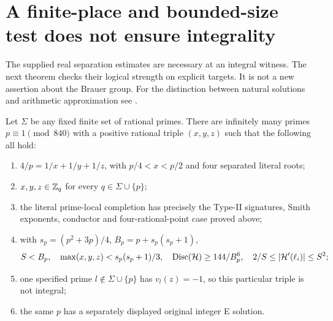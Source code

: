 \section{A finite-place and bounded-size test does not ensure integrality}
The supplied real separation estimates \cite[\S1.2, equations (2)--(4)]{Input}
are necessary at an integral witness. The next theorem checks their logical
strength on explicit targets. It is not a new assertion about the Brauer group.
For the distinction between natural solutions and arithmetic approximation see
\cite[Theorems 1.1, 1.8 and 1.9]{BL}.

\begin{theorem}
\label{thm:crtcontrols}
Let $\Sigma$ be any fixed finite set of rational primes. There are infinitely
many primes $p\equiv1\pmod{840}$ with a positive rational triple $(x,y,z)$ such
that the following all hold:
\begin{enumerate}
\item $4/p=1/x+1/y+1/z$, with $p/4<x<p/2$ and four separated literal roots;
\item $x,y,z\in\mathbb Z_q$ for every $q\in\Sigma\cup\{p\}$;
\item the literal prime-local completion has precisely the Type-II signatures,
Smith exponents, conductor and four-rational-point case proved above;
\item with $s_p=(p^2+3p)/4$, $B_p=p+s_p(s_p+1)$,
\[
 S<B_p,\quad\max(x,y,z)<s_p(s_p+1)/3,\quad
 \operatorname{Disc}(\mathcal H)\ge144/B_p^6,\quad
 2/S\le|\mathcal H'(\ell_i)|\le S^2;
\]
\item one specified prime $l\notin\Sigma\cup\{p\}$ has $v_l(z)=-1$, so this
particular triple is not integral;
\item the same $p$ has a separately displayed original integer E solution.
\end{enumerate}
\end{theorem}
